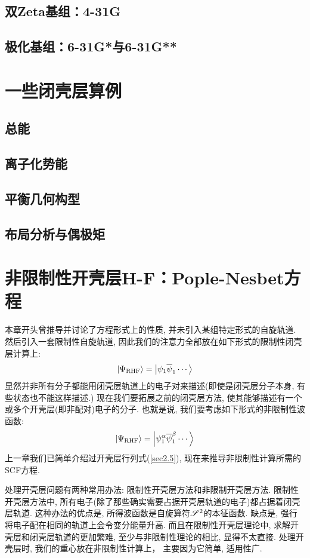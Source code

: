 \subsection{双Zeta基组：4-31G}
\subsection{极化基组：6-31G*与6-31G**}
\section{一些闭壳层算例}
\subsection{总能}
\subsection{离子化势能}
\subsection{平衡几何构型}
\subsection{布局分析与偶极矩}

\section{非限制性开壳层H-F：Pople-Nesbet方程}
本章开头曾推导并讨论了\hft 方程形式上的性质, 并未引入某组特定形式的自旋轨道. 然后引入一套限制性自旋轨道, 因此我们的注意力全部放在如下形式的限制性闭壳层计算上:
\begin{align}
\Ket{\Psi_\mathrm{RHF}} = \Ket{\psi_1\overline{\psi}_1\cdots}
\end{align}
显然并非所有分子都能用闭壳层轨道上的电子对来描述(即使是闭壳层分子本身, 有些状态也不能这样描述.) 现在我们要拓展之前的闭壳层方法, 使其能够描述有一个或多个开壳层(即非配对)电子的分子. 也就是说, 我们要考虑如下形式的非限制性波函数:
\begin{align}
\Ket{\Psi_\mathrm{RHF}} = \Ket{\psi_1^\alpha\overline{\psi}_1^\beta\cdots}
\end{align}
上一章我们已简单介绍过开壳层行列式(\ref{sec2.5}), 现在来推导非限制性计算所需的SCF方程.

处理开壳层问题有两种常用办法: 限制性开壳层\hft 方法和非限制开壳层\hft 方法. 限制性开壳层方法中, 所有电子(除了那些确实需要占据开壳层轨道的电子)都占据着闭壳层轨道. 这种办法的优点是, 所得波函数是自旋算符$\mathscr{S}^2$的本征函数. 缺点是, 强行将电子配在相同的轨道上会令变分能量升高. 而且在限制性开壳层\hft 理论中, 求解开壳层和闭壳层轨道的更加繁难, 至少与非限制性\hft 理论的相比, 显得不太直接. 处理开壳层时, 我们的重心放在非限制性计算上， 主要因为它简单, 适用性广.

